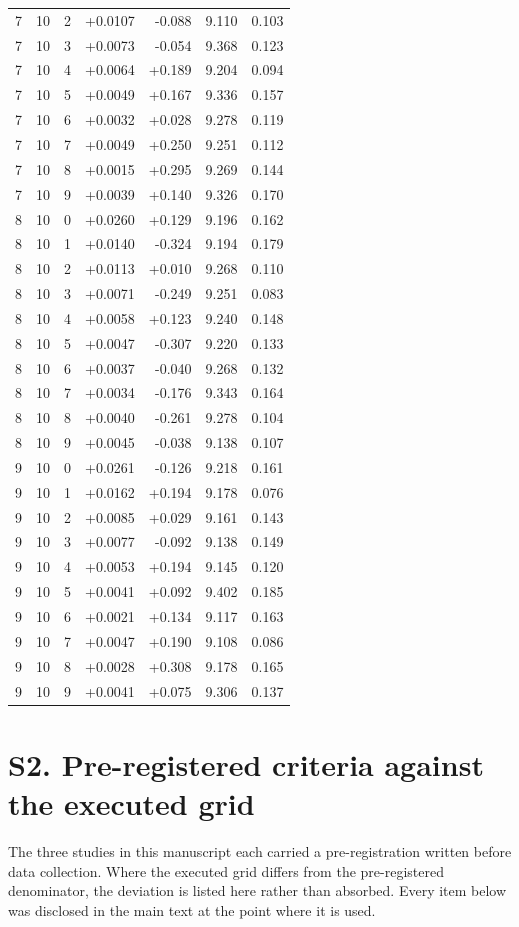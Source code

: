 \documentclass[10pt]{article}
\begin{document}
\begin{longtable}{llrrrrr}
7 & 10 & 2 & +0.0107 & -0.088 & 9.110 & 0.103 \\
7 & 10 & 3 & +0.0073 & -0.054 & 9.368 & 0.123 \\
7 & 10 & 4 & +0.0064 & +0.189 & 9.204 & 0.094 \\
7 & 10 & 5 & +0.0049 & +0.167 & 9.336 & 0.157 \\
7 & 10 & 6 & +0.0032 & +0.028 & 9.278 & 0.119 \\
7 & 10 & 7 & +0.0049 & +0.250 & 9.251 & 0.112 \\
7 & 10 & 8 & +0.0015 & +0.295 & 9.269 & 0.144 \\
7 & 10 & 9 & +0.0039 & +0.140 & 9.326 & 0.170 \\
8 & 10 & 0 & +0.0260 & +0.129 & 9.196 & 0.162 \\
8 & 10 & 1 & +0.0140 & -0.324 & 9.194 & 0.179 \\
8 & 10 & 2 & +0.0113 & +0.010 & 9.268 & 0.110 \\
8 & 10 & 3 & +0.0071 & -0.249 & 9.251 & 0.083 \\
8 & 10 & 4 & +0.0058 & +0.123 & 9.240 & 0.148 \\
8 & 10 & 5 & +0.0047 & -0.307 & 9.220 & 0.133 \\
8 & 10 & 6 & +0.0037 & -0.040 & 9.268 & 0.132 \\
8 & 10 & 7 & +0.0034 & -0.176 & 9.343 & 0.164 \\
8 & 10 & 8 & +0.0040 & -0.261 & 9.278 & 0.104 \\
8 & 10 & 9 & +0.0045 & -0.038 & 9.138 & 0.107 \\
9 & 10 & 0 & +0.0261 & -0.126 & 9.218 & 0.161 \\
9 & 10 & 1 & +0.0162 & +0.194 & 9.178 & 0.076 \\
9 & 10 & 2 & +0.0085 & +0.029 & 9.161 & 0.143 \\
9 & 10 & 3 & +0.0077 & -0.092 & 9.138 & 0.149 \\
9 & 10 & 4 & +0.0053 & +0.194 & 9.145 & 0.120 \\
9 & 10 & 5 & +0.0041 & +0.092 & 9.402 & 0.185 \\
9 & 10 & 6 & +0.0021 & +0.134 & 9.117 & 0.163 \\
9 & 10 & 7 & +0.0047 & +0.190 & 9.108 & 0.086 \\
9 & 10 & 8 & +0.0028 & +0.308 & 9.178 & 0.165 \\
9 & 10 & 9 & +0.0041 & +0.075 & 9.306 & 0.137 \\
\end{longtable}

\section{S2. Pre-registered criteria against the executed grid}
\noindent The three studies in this manuscript each carried a
pre-registration written before data collection. Where the executed grid
differs from the pre-registered denominator, the deviation is listed here
rather than absorbed. Every item below was disclosed in the main text at
the point where it is used.
\end{document}

